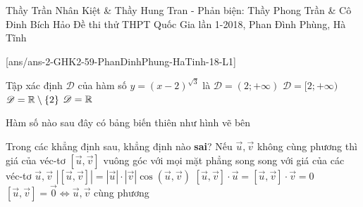 
\begin{name}
{Thầy Trần Nhân Kiệt \& Thầy Hung Tran - Phản biện: Thầy Phong Trần \& Cô Đinh Bích Hảo}
{Đề thi thử THPT Quốc Gia lần 1-2018, Phan Đình Phùng, Hà Tĩnh}
\end{name}
\setcounter{ex}{0}\setcounter{bt}{0}
[ans/ans-2-GHK2-59-PhanDinhPhung-HaTinh-18-L1]
\begin{ex}%
Tập xác định $ \mathscr{D} $ của hàm số $ y=(x-2)^{\sqrt{3}} $ là
\choice
{\True $ \mathscr{D}=(2;+\infty) $}
{$ \mathscr{D}=[2;+\infty) $}
{$ \mathscr{D}=\Bbb{R}\setminus\{2\} $}
{$ \mathscr{D}=\Bbb{R} $}
\end{ex}

\begin{ex}%
Hàm số nào sau đây có bảng biến thiên như hình vẽ bên
{
}

\end{ex}

\begin{ex}%
Trong các khẳng định sau, khẳng định nào {\bf sai}?
\choice
{Nếu $ \overrightarrow{u}, \overrightarrow{v} $ không cùng phương thì giá của véc-tơ $ [\overrightarrow{u}, \overrightarrow{v}] $  vuông góc với mọi mặt phẳng song song với giá của các véc-tơ $ \overrightarrow{u}, \overrightarrow{v} $ }
{\True $ |\left[ \overrightarrow{u}, \overrightarrow{v}\right]|= |\overrightarrow{u}| \cdot |\overrightarrow{v}|\cos\left( \overrightarrow{u}, \overrightarrow{v}\right) $}
{$ \left[ \overrightarrow{u}, \overrightarrow{v}\right]\cdot \overrightarrow{u}=\left[ \overrightarrow{u}, \overrightarrow{v}\right]\cdot \overrightarrow{v}=0 $}
{$ \left[ \overrightarrow{u}, \overrightarrow{v}\right]=\overrightarrow{0}\Leftrightarrow \overrightarrow{u}, \overrightarrow{v}  $ cùng phương}
\end{ex}

